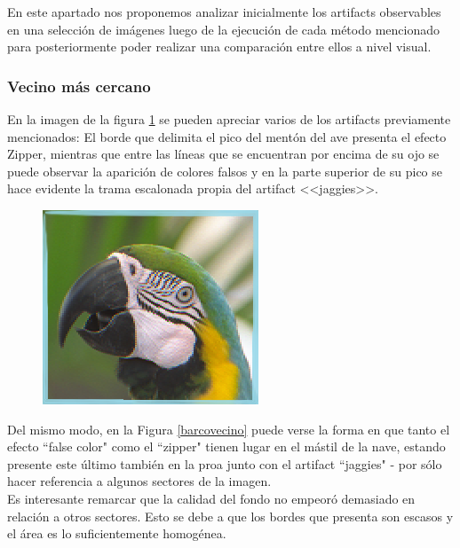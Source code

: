\documentclass[a4paper]{article}
\begin{document}
En este apartado nos proponemos analizar inicialmente los artifacts observables en una selección de imágenes luego de la ejecución de cada método mencionado para posteriormente poder realizar una comparación entre ellos a nivel visual.

\subsubsection{Vecino más cercano}

En la imagen de la figura \ref{lorovecino} se pueden apreciar varios de los artifacts previamente mencionados: 
El borde que delimita el pico del mentón del ave presenta el efecto Zipper, mientras que entre las líneas que se encuentran por encima de su ojo se puede observar la aparición de colores falsos y en la parte superior de su pico se hace evidente la trama escalonada propia del artifact <<jaggies>>.


\begin{figure}[h!]
	\caption{}
	\begin{center}
	\includegraphics[scale=1]{imagenes/lorovecino}
	\label{lorovecino}
  \end{center}
\end{figure}


Del mismo modo, en la Figura \ref{barcovecino}  puede verse la forma en que tanto el efecto ``false color" como el ``zipper" tienen lugar en el mástil de la nave, estando presente este último también en la proa junto con el artifact ``jaggies" - por sólo hacer referencia a algunos sectores de la imagen.\\
Es interesante remarcar que la calidad del fondo no empeoró demasiado en relación  a otros sectores. Esto se debe a que los bordes que presenta son escasos y el área es lo suficientemente homogénea.
\end{document}
